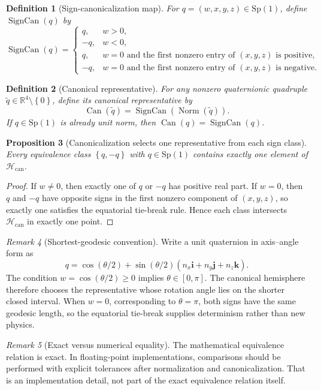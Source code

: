 \documentclass[11pt]{article}
\newtheorem{definition}{Definition}[section]
\newtheorem{proposition}[definition]{Proposition}
\theoremstyle{remark}
\newtheorem{remark}[definition]{Remark}
\newcommand{\R}{\mathbb{R}}
\newcommand{\ii}{\mathbf{i}}
\newcommand{\jj}{\mathbf{j}}
\newcommand{\kk}{\mathbf{k}}
\newcommand{\set}[1]{\left\{ #1 \right\}}
\newcommand{\canon}{\operatorname{Can}}
\newcommand{\normalize}{\operatorname{Norm}}
\newcommand{\sgncanon}{\operatorname{SignCan}}
\begin{document}
\begin{definition}[Sign-canonicalization map]
For $q=(w,x,y,z)\in\mathrm{Sp}(1)$, define $\sgncanon(q)$ by
\[
\sgncanon(q)=
\begin{cases}
q, & w>0,\\
-q, & w<0,\\
q, & w=0 \text{ and the first nonzero entry of } (x,y,z) \text{ is positive},\\
-q, & w=0 \text{ and the first nonzero entry of } (x,y,z) \text{ is negative}.
\end{cases}
\]
\end{definition}

\begin{definition}[Canonical representative]
For any nonzero quaternionic quadruple $\tilde q\in\R^4\setminus\set{0}$,
define its canonical representative by
\[
\canon(\tilde q)=\sgncanon(\normalize(\tilde q)).
\]
If $q\in\mathrm{Sp}(1)$ is already unit norm, then $\canon(q)=\sgncanon(q)$.
\end{definition}

\begin{proposition}[Canonicalization selects one representative from each sign class]
Every equivalence class $\set{q,-q}$ with $q\in\mathrm{Sp}(1)$ contains exactly
one element of $\mathcal{H}_{\mathrm{can}}$.
\end{proposition}

\begin{proof}
If $w\neq 0$, then exactly one of $q$ or $-q$ has positive real part. If
$w=0$, then $q$ and $-q$ have opposite signs in the first nonzero component of
$(x,y,z)$, so exactly one satisfies the equatorial tie-break rule. Hence each
class intersects $\mathcal{H}_{\mathrm{can}}$ in exactly one point.
\end{proof}

\begin{remark}[Shortest-geodesic convention]
Write a unit quaternion in axis--angle form as
\[
q=\cos(\theta/2)+\sin(\theta/2)(n_x\ii+n_y\jj+n_z\kk).
\]
The condition $w=\cos(\theta/2)\geq 0$ implies $\theta\in[0,\pi]$. The
canonical hemisphere therefore chooses the representative whose rotation angle
lies on the shorter closed interval. When $w=0$, corresponding to $\theta=\pi$,
both signs have the same geodesic length, so the equatorial tie-break supplies
determinism rather than new physics.
\end{remark}

\begin{remark}[Exact versus numerical equality]
The mathematical equivalence relation is exact. In floating-point
implementations, comparisons should be performed with explicit tolerances after
normalization and canonicalization. That is an implementation detail, not part
of the exact equivalence relation itself.
\end{remark}
\end{document}

